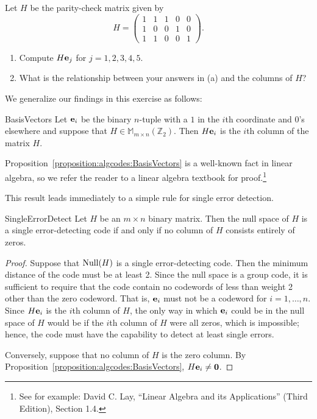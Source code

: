 \begin{exercise}{}
Let $H$ be the parity-check matrix given by
\[ H =
\left(
\begin{array}{ccccc}
1 & 1 & 1 & 0 & 0 \\
1 & 0 & 0 & 1 & 0 \\
1 & 1 & 0 & 0 & 1
\end{array}
\right).\]
\begin{enumerate}
\item 
Compute $H {\bold e}_j$ for $j = 1,2,3,4,5$.
\item
What is the relationship between your answers in (a) and the columns of $H$?
\end{enumerate}
\end{exercise}

We generalize our findings in this exercise as follows:

\begin{prop}{BasisVectors}
Let ${\bold e}_i$ be the binary $n$-tuple with a $1$ in the $i$th
coordinate and $0$'s elsewhere and suppose that $H \in \mathbb{M}_{m
\times n}(\mathbb{Z}_2)$. Then $H{\bold e}_i$ is the $i$th column of
the matrix $H$.  
\end{prop}
 Proposition~\ref{proposition:algcodes:BasisVectors} is a well-known fact in linear algebra, so we refer the reader to a linear algebra textbook for proof.\footnote{See for example: David C. Lay, ``Linear Algebra and its Applications'' (Third Edition), Section 1.4.}
 
 This result leads immediately to a simple rule for single error detection.
 
\begin{prop}{SingleErrorDetect}
Let $H$ be an $m \times n$ binary matrix. Then the null space of $H$
is a single error-detecting code if and only if no column of $H$
consists entirely of zeros. 
\end{prop}
 
 \begin{proof}
Suppose that ${\rm Null}(H)$ is a single error-detecting code. Then the minimum
distance of the code must be at least 2. Since the null space is a
group code, it is sufficient to require that the code contain no
codewords of less than weight 2 other than the zero codeword. That
is, ${\bold e}_i$ must not be a codeword for $i = 1, \ldots, n$. Since
$H{\bold e}_i$ is the $i$th column of $H$, the only way in which
${\bold e}_i$ could be in the null space of $H$ would be if the $i$th
column of $H$ were all zeros, which is impossible; hence, the code must have
the capability to detect at least single errors.
 
 Conversely, suppose that no column of $H$ is the zero column. By 
Proposition~\ref{proposition:algcodes:BasisVectors}, $H{\bold e}_i \neq {\bold 0}$.
\end{proof}
 
